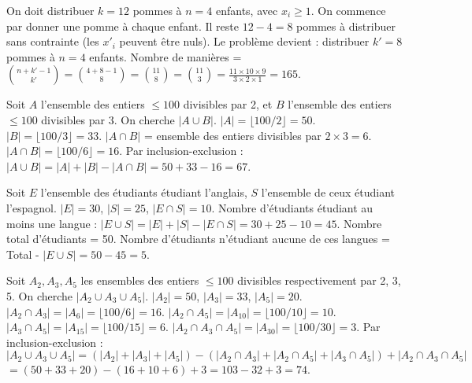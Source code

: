 \begin{correctionbox}
On doit distribuer $k=12$ pommes à $n=4$ enfants, avec $x_i \ge 1$.
On commence par donner une pomme à chaque enfant. Il reste $12 - 4 = 8$ pommes à distribuer sans contrainte (les $x'_i$ peuvent être nuls).
Le problème devient : distribuer $k'=8$ pommes à $n=4$ enfants.
Nombre de manières = $\binom{n+k'-1}{k'} = \binom{4+8-1}{8} = \binom{11}{8} = \binom{11}{3} = \frac{11 \times 10 \times 9}{3 \times 2 \times 1} = 165$.
\end{correctionbox}


\begin{correctionbox}
Soit $A$ l'ensemble des entiers $\le 100$ divisibles par 2, et $B$ l'ensemble des entiers $\le 100$ divisibles par 3. On cherche $|A \cup B|$.
$|A| = \lfloor 100/2 \rfloor = 50$.
$|B| = \lfloor 100/3 \rfloor = 33$.
$|A \cap B|$ = ensemble des entiers divisibles par $2 \times 3 = 6$. $|A \cap B| = \lfloor 100/6 \rfloor = 16$.
Par inclusion-exclusion : $|A \cup B| = |A| + |B| - |A \cap B| = 50 + 33 - 16 = 67$.
\end{correctionbox}

\begin{correctionbox}
Soit $E$ l'ensemble des étudiants étudiant l'anglais, $S$ l'ensemble de ceux étudiant l'espagnol.
$|E| = 30$, $|S| = 25$, $|E \cap S| = 10$.
Nombre d'étudiants étudiant au moins une langue : $|E \cup S| = |E| + |S| - |E \cap S| = 30 + 25 - 10 = 45$.
Nombre total d'étudiants = 50.
Nombre d'étudiants n'étudiant aucune de ces langues = Total - $|E \cup S| = 50 - 45 = 5$.
\end{correctionbox}

\begin{correctionbox}
Soit $A_2, A_3, A_5$ les ensembles des entiers $\le 100$ divisibles respectivement par 2, 3, 5. On cherche $|A_2 \cup A_3 \cup A_5|$.
$|A_2|=50$, $|A_3|=33$, $|A_5|=20$.
$|A_2 \cap A_3| = |A_6| = \lfloor 100/6 \rfloor = 16$.
$|A_2 \cap A_5| = |A_{10}| = \lfloor 100/10 \rfloor = 10$.
$|A_3 \cap A_5| = |A_{15}| = \lfloor 100/15 \rfloor = 6$.
$|A_2 \cap A_3 \cap A_5| = |A_{30}| = \lfloor 100/30 \rfloor = 3$.
Par inclusion-exclusion :
$|A_2 \cup A_3 \cup A_5| = (|A_2|+|A_3|+|A_5|) - (|A_2 \cap A_3|+|A_2 \cap A_5|+|A_3 \cap A_5|) + |A_2 \cap A_3 \cap A_5|$
$= (50+33+20) - (16+10+6) + 3 = 103 - 32 + 3 = 74$.
\end{correctionbox}

